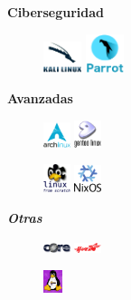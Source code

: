 \documentclass[aspectratio=43]{beamer}
\begin{document}
\begin{frame}{\subsecname}{}
        \begin{multicols}{3}
            \centering \textbf{Ciberseguridad}
            \begin{figure}
                \includegraphics[width=0.1\textwidth]{img/kali.png}
                \includegraphics[width=0.1\textwidth]{img/parrot.png}
            \end{figure}
            \newpage
            \centering \textbf{Avanzadas}
            \begin{figure}
                \includegraphics[width=0.07\textwidth]{img/arch.png}
                \includegraphics[width=0.07\textwidth]{img/gentoo.png}
            \end{figure}
            \begin{figure}
                \includegraphics[width=0.07\textwidth]{img/lfs.png}
                \includegraphics[width=0.07\textwidth]{img/nixos.png}
            \end{figure}
            \newpage
            \centering \textbf{\textit{Otras}}
            \begin{figure}
                \includegraphics[width=0.07\textwidth]{img/tinycore.png}
                \includegraphics[width=0.07\textwidth]{img/redstaros.png}
            \end{figure}
            \begin{figure}
                \includegraphics[width=0.05\textwidth]{img/hannah.png}
            \end{figure}
        \end{multicols}
    \end{frame}
\end{document}
